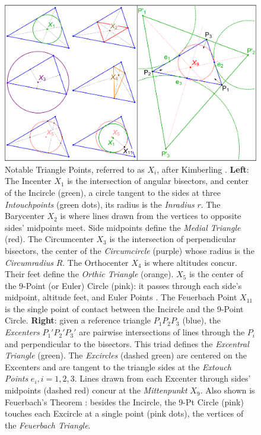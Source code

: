 \begin{figure}
    \centering
    \includegraphics[width=\textwidth]{pics/u0039_constr.pdf}
    \caption{Notable Triangle Points, referred to as $X_i$, after Kimberling \cite{etc}. \textbf{Left}: The Incenter $X_1$ is the intersection of angular bisectors, and center of the Incircle (green), a circle tangent to the sides at three {\em Intouchpoints} (green dots), its radius is the {\em Inradius} $r$. The Barycenter $X_2$ is where lines drawn from the vertices to opposite sides' midpoints meet. Side midpoints define the {\em Medial Triangle} (red). The Circumcenter $X_3$ is the intersection of perpendicular bisectors, the center of the {\em Circumcircle} (purple) whose radius is the {\em Circumradius} $R$. The Orthocenter $X_4$ is where altitudes concur. Their feet define the {\em Orthic Triangle} (orange). $X_5$ is the center of the 9-Point (or Euler) Circle (pink): it passes through each side's midpoint, altitude feet, and Euler Points \cite{mw}. The Feuerbach Point $X_{11}$ is the single point of contact between the Incircle and the 9-Point Circle. \textbf{Right}: given a reference triangle $P_1P_2P_3$ (blue), the {\em Excenters} $P_1'P_2'P_3'$ are pairwise intersections of lines through the $P_i$ and perpendicular to the bisectors. This triad defines the {\em Excentral Triangle} (green). The {\em Excircles}  (dashed green) are centered on the Excenters and are tangent to the triangle sides at the {\em Extouch Points} $e_i,i=1,2,3$. Lines drawn from each Excenter through sides' midpoints (dashed red) concur at the {\em Mittenpunkt} $X_9$. Also shown is Feuerbach's Theorem \cite{mw}: besides the Incircle, the 9-Pt Circle (pink) touches each Excircle at a single point (pink dots), the vertices of the {\em Feuerbach Triangle}.}
    \label{fig:constructions}
\end{figure}


